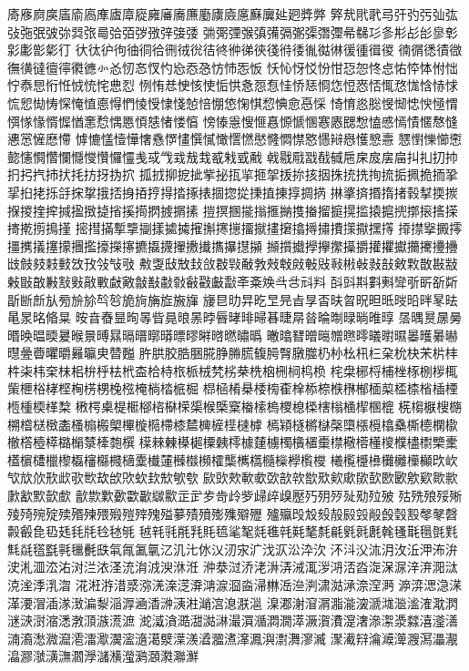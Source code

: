 㢊㢋㢌㢍㢎㢏㢐㢑㢒㢓㢔㢕㢖㢗㢘㢙㢚㢛㢜㢝㢞㢟㢠㢡㢢
㢣㢤㢥㢦㢧㢨㢩㢪㢫㢬㢭㢮㢯㢰㢱㢲㢳㢴㢵㢶㢷㢸㢹㢺㢻
㢼㢽㢾㢿㣀㣁㣂㣃㣄㣅㣆㣇㣈㣉㣊㣋㣌㣍㣎㣏㣐㣑㣒㣓㣔
㣕㣖㣗㣘㣙㣚㣛㣜㣝㣞㣟㣠㣡㣢㣣㣤㣥㣦㣧㣨㣩㣪㣫㣬㣭
㣮㣯㣰㣱㣲㣳㣴㣵㣶㣷㣸㣹㣺㣻㣼㣽㣾㣿㤀㤁㤂㤃㤄㤅㤆
㤇㤈㤉㤊㤋㤌㤍㤎㤏㤐㤑㤒㤓㤔㤕㤖㤗㤙㤚㤛㤜㤝㤞㤟㤠
㤡㤢㤣㤤㤥㤦㤧㤨㤩㤪㤫㤬㤭㤮㤯㤰㤱㤲㤳㤴㤵㤶㤷㤸㤹
㤺㤻㤼㤽㤾㤿㥀㥁㥂㥃㥄㥅㥆㥇㥈㥉㥊㥋㥌㥍㥎㥏㥐㥑㥒
㥓㥔㥕㥖㥗㥘㥙㥚㥛㥜㥝㥞㥟㥠㥡㥢㥣㥤㥥㥦㥧㥨㥩㥪㥫
㥬㥭㥯㥰㥱㥲㥳㥴㥵㥶㥷㥸㥹㥺㥻㥼㥽㥾㥿㦀㦁㦂㦃㦄㦅
㦆㦇㦈㦉㦊㦋㦌㦍㦎㦏㦐㦑㦒㦓㦔㦕㦖㦗㦘㦙㦚㦛㦜㦝㦞
㦟㦠㦡㦢㦣㦤㦥㦦㦧㦨㦩㦪㦫㦬㦭㦮㦯㦰㦱㦲㦳㦴㦵㦶㦷
㦸㦹㦺㦻㦼㦽㦾㦿㧀㧁㧂㧃㧄㧅㧆㧇㧈㧉㧊㧋㧌㧍㧎㧑㧒
㧓㧔㧕㧖㧗㧘㧙㧚㧛㧜㧝㧞㧠㧡㧢㧣㧤㧥㧦㧧㧨㧩㧪㧫㧬
㧭㧮㧯㧰㧱㧲㧳㧴㧵㧶㧷㧸㧹㧺㧻㧼㧽㧾㧿㨀㨁㨂㨃㨄㨅
㨆㨇㨈㨉㨊㨋㨌㨍㨎㨏㨐㨑㨒㨓㨔㨕㨖㨗㨘㨙㨚㨛㨜㨝㨞
㨟㨠㨡㨢㨣㨤㨥㨦㨧㨨㨩㨪㨫㨬㨭㨮㨯㨰㨱㨲㨳㨴㨵㨶㨷
㨸㨹㨺㨻㨼㨽㨾㨿㩀㩁㩂㩃㩄㩅㩆㩇㩈㩉㩊㩋㩌㩍㩎㩏㩐
㩑㩒㩓㩔㩕㩖㩗㩘㩙㩚㩛㩜㩝㩞㩟㩠㩡㩢㩣㩤㩥㩦㩧㩨㩩
㩪㩫㩬㩭㩮㩯㩰㩱㩲㩴㩵㩶㩷㩸㩹㩺㩻㩼㩽㩾㩿㪀㪁㪂㪃
㪄㪅㪆㪇㪈㪉㪊㪋㪌㪍㪎㪏㪐㪑㪒㪓㪔㪕㪖㪗㪘㪙㪚㪛㪜
㪝㪞㪟㪠㪡㪢㪣㪤㪥㪦㪧㪨㪩㪪㪫㪬㪭㪮㪯㪰㪱㪲㪳㪴㪵
㪶㪷㪸㪹㪺㪻㪼㪽㪾㪿㫀㫁㫂㫃㫄㫅㫆㫇㫈㫉㫊㫋㫌㫍㫎
㫏㫐㫑㫒㫓㫔㫕㫖㫗㫘㫙㫚㫛㫜㫝㫞㫟㫠㫡㫢㫣㫤㫥㫦㫧
㫨㫩㫪㫫㫬㫭㫮㫯㫰㫱㫲㫳㫴㫵㫶㫷㫸㫹㫺㫻㫼㫽㫾㫿㬀
㬁㬂㬃㬄㬅㬆㬇㬈㬉㬊㬋㬌㬍㬎㬏㬐㬑㬒㬓㬔㬕㬖㬗㬘㬙
㬚㬛㬜㬝㬞㬟㬠㬡㬢㬣㬤㬥㬦㬧㬨㬩㬪㬫㬬㬭㬮㬯㬰㬱㬲
㬳㬴㬵㬶㬷㬸㬹㬺㬻㬼㬽㬾㬿㭀㭁㭂㭃㭄㭅㭆㭇㭈㭉㭊㭋
㭌㭍㭏㭐㭑㭒㭓㭔㭕㭖㭗㭘㭙㭚㭛㭜㭝㭞㭟㭠㭡㭢㭣㭤㭥
㭦㭧㭨㭩㭪㭫㭬㭭㭮㭯㭰㭱㭲㭳㭴㭵㭶㭷㭸㭹㭺㭻㭼㭽㭾
㭿㮀㮁㮂㮃㮄㮅㮆㮇㮈㮉㮊㮋㮌㮍㮎㮏㮐㮑㮒㮓㮔㮕㮖㮗
㮘㮙㮚㮛㮜㮝㮞㮟㮠㮡㮢㮣㮤㮥㮦㮧㮨㮩㮪㮫㮬㮭㮮㮯㮰
㮱㮲㮳㮴㮵㮶㮷㮸㮹㮺㮻㮼㮽㮾㮿㯀㯁㯂㯃㯄㯅㯆㯇㯈㯉
㯊㯋㯌㯍㯎㯏㯐㯑㯒㯓㯔㯕㯖㯗㯘㯙㯚㯛㯜㯝㯞㯟㯠㯡㯢
㯣㯤㯥㯦㯧㯨㯩㯪㯫㯬㯭㯮㯯㯰㯱㯲㯳㯴㯵㯶㯷㯸㯹㯺㯻
㯼㯽㯾㯿㰀㰁㰂㰃㰄㰅㰆㰇㰈㰉㰊㰋㰌㰍㰎㰏㰐㰑㰒㰓㰔
㰕㰖㰗㰘㰙㰚㰛㰜㰝㰞㰟㰠㰡㰢㰣㰤㰥㰦㰧㰨㰩㰪㰫㰬㰭
㰮㰯㰰㰱㰲㰳㰴㰵㰶㰷㰸㰹㰺㰻㰼㰽㰾㰿㱀㱁㱂㱃㱄㱅㱆
㱇㱈㱉㱊㱋㱌㱍㱎㱏㱐㱑㱒㱓㱔㱕㱖㱗㱘㱙㱚㱛㱜㱝㱞㱟
㱠㱡㱢㱣㱤㱥㱦㱧㱨㱩㱪㱫㱬㱭㱯㱰㱱㱲㱳㱴㱵㱶㱷㱸㱹
㱺㱻㱼㱽㱾㱿㲀㲁㲂㲃㲄㲅㲆㲇㲈㲉㲊㲋㲌㲍㲎㲏㲐㲑㲒
㲓㲔㲕㲖㲗㲘㲙㲚㲛㲜㲝㲞㲟㲠㲡㲢㲣㲤㲥㲦㲧㲨㲩㲪㲫
㲬㲭㲮㲯㲰㲱㲲㲳㲴㲵㲶㲷㲸㲹㲺㲻㲼㲽㲾㲿㳀㳁㳂㳃㳄
㳅㳆㳇㳈㳉㳊㳋㳌㳍㳎㳏㳐㳑㳒㳓㳔㳕㳖㳗㳘㳙㳚㳛㳜㳝
㳞㳟㳡㳢㳣㳤㳥㳦㳧㳨㳩㳪㳫㳬㳭㳮㳯㳰㳱㳲㳳㳴㳵㳶㳷
㳸㳹㳺㳻㳼㳽㳾㳿㴀㴁㴂㴃㴄㴅㴆㴇㴈㴉㴊㴋㴌㴍㴎㴏㴐
㴑㴒㴓㴔㴕㴖㴗㴘㴙㴚㴛㴜㴝㴞㴟㴠㴡㴢㴣㴤㴥㴦㴧㴨㴩
㴪㴫㴬㴭㴮㴯㴰㴱㴲㴳㴴㴵㴶㴷㴸㴹㴺㴻㴼㴽㴾㴿㵀㵁㵂
㵃㵄㵅㵆㵇㵈㵉㵊㵋㵌㵍㵎㵏㵐㵑㵒㵓㵔㵕㵖㵗㵘㵙㵚㵛
㵜㵝㵞㵟㵠㵡㵢㵣㵤㵥㵦㵧㵨㵩㵪㵫㵬㵭㵮㵯㵰㵱㵲㵳㵴
㵵㵶㵷㵸㵹㵺㵻㵼㵽㵾㵿㶀㶁㶂㶃㶄㶅㶆㶇㶈㶉㶊㶋㶌㶍
